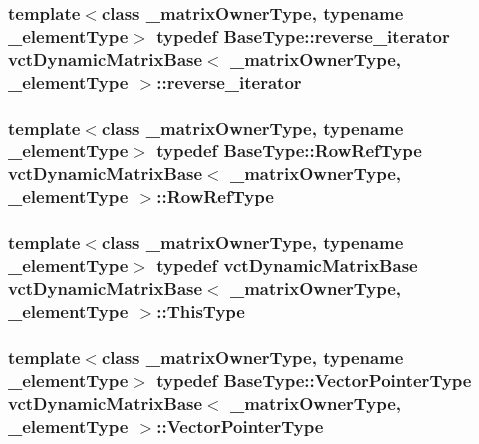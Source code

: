 \hypertarget{classvct_dynamic_matrix_base_a5390b4a252fc2e2bbe94cbd19f8c9fa2}{
\subsubsection[{reverse\-\_\-iterator}]{\setlength{\rightskip}{0pt plus 5cm}template$<$class \-\_\-matrix\-Owner\-Type, typename \-\_\-element\-Type$>$ typedef {\bf Base\-Type\-::reverse\-\_\-iterator} {\bf vct\-Dynamic\-Matrix\-Base}$<$ \-\_\-matrix\-Owner\-Type, \-\_\-element\-Type $>$\-::{\bf reverse\-\_\-iterator}}}\label{classvct_dynamic_matrix_base_a5390b4a252fc2e2bbe94cbd19f8c9fa2}
\hypertarget{classvct_dynamic_matrix_base_a32b85f46bce5ec110e29208e241f82c3}{
\subsubsection[{Row\-Ref\-Type}]{\setlength{\rightskip}{0pt plus 5cm}template$<$class \-\_\-matrix\-Owner\-Type, typename \-\_\-element\-Type$>$ typedef {\bf Base\-Type\-::\-Row\-Ref\-Type} {\bf vct\-Dynamic\-Matrix\-Base}$<$ \-\_\-matrix\-Owner\-Type, \-\_\-element\-Type $>$\-::{\bf Row\-Ref\-Type}}}\label{classvct_dynamic_matrix_base_a32b85f46bce5ec110e29208e241f82c3}
\hypertarget{classvct_dynamic_matrix_base_afc70802fd7c3e318e8bad4532b945f82}{
\subsubsection[{This\-Type}]{\setlength{\rightskip}{0pt plus 5cm}template$<$class \-\_\-matrix\-Owner\-Type, typename \-\_\-element\-Type$>$ typedef {\bf vct\-Dynamic\-Matrix\-Base} {\bf vct\-Dynamic\-Matrix\-Base}$<$ \-\_\-matrix\-Owner\-Type, \-\_\-element\-Type $>$\-::{\bf This\-Type}}}\label{classvct_dynamic_matrix_base_afc70802fd7c3e318e8bad4532b945f82}
\hypertarget{classvct_dynamic_matrix_base_a58735349c10ccb0b0b1708b52e3a1569}{
\subsubsection[{Vector\-Pointer\-Type}]{\setlength{\rightskip}{0pt plus 5cm}template$<$class \-\_\-matrix\-Owner\-Type, typename \-\_\-element\-Type$>$ typedef {\bf Base\-Type\-::\-Vector\-Pointer\-Type} {\bf vct\-Dynamic\-Matrix\-Base}$<$ \-\_\-matrix\-Owner\-Type, \-\_\-element\-Type $>$\-::{\bf Vector\-Pointer\-Type}}}\label{classvct_dynamic_matrix_base_a58735349c10ccb0b0b1708b52e3a1569}


